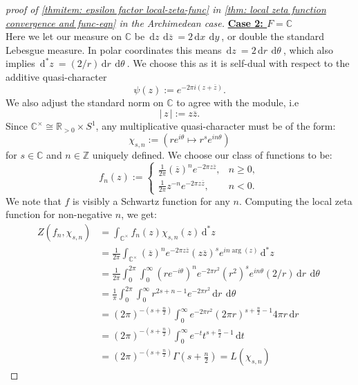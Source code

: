 \documentclass[11pt, x11names, openany]{book}
\newcommand{\zz}{\mathbb{Z}}
\newcommand{\rr}{\mathbb{R}}
\newcommand{\cc}{\mathbb{C}}
\renewcommand{\bar}[1]{\overline{#1}}
\renewcommand{\brack}[1]{\left(   #1 \right)}
\newcommand{\abs}[1]{\left| \, #1  \,\right|}
\newcommand{\dr}{\, \mathrm{d}r \ }
\newcommand{\dt}{\, \mathrm{d}t \ }
\newcommand{\dx}{\, \mathrm{d}x \ }
\newcommand{\dy}{\, \mathrm{d}y \ }
\newcommand{\dz}{\, \mathrm{d}z \ }
\newcommand{\dtheta}{\, \mathrm{d}\theta \ }
\renewcommand{\d}[1]{\, \mathrm{d}#1 \ }
\begin{document}
\begin{proof}[proof of \ref{thmitem: epsilon factor local-zeta-func} in \ref{thm: local zeta function convergence and func-eqn} in the Archimedean case]
\textbf{\underline{Case 2: $F = \cc$}}\\
Here we let our measure on $\cc$ be $\dz \d{\bar{z}} = 2 \dx\dy$, or double the standard Lebesgue measure. In polar coordinates this means $\dz = 2 \dr \dtheta$, which also implies $\d{^*z} = (2/r) \dr \dtheta$. We choose this as it is self-dual with respect to the additive quasi-character
\begin{equation*}
    \psi(z) := e^{- 2 \pi i (z + \bar{z})}.
\end{equation*} 
We also adjust the standard norm on $\cc$ to agree with the module, i.e
\begin{equation*}
    \abs{z} := z \bar{z}.
\end{equation*}
Since $\cc^\times \cong \rr_{> 0} \times S^1$, any multiplicative quasi-character must be of the form:
\begin{equation*}
    \chi_{s, n} := (re^{i\theta} \mapsto r^s e^{i n \theta})
\end{equation*}
for $s \in \cc$ and $n \in \zz$ uniquely defined. We choose our class of functions to be:
\begin{equation*}
    f_n(z) := \begin{cases}
        \frac{1}{2\pi} \brack{\bar{z}}^n e^{- 2 \pi z \bar{z}}, & n \geq 0,\\
        \frac{1}{2\pi} z^{-n} e^{- 2 \pi z \bar{z}}, & n < 0.
    \end{cases}
\end{equation*}
We note that $f$ is visibly a Schwartz function for any $n$. Computing the local zeta function for non-negative $n$, we get:
\begin{align*}
    Z(f_n, \chi_{s, n}) &= \int_{\cc^\times} f_n(z) \chi_{s, n}(z)\d{^*z}\\
    &= \frac{1}{2\pi} \int_{\cc^\times}\brack{\bar{z}}^ne^{ - 2 \pi z \bar{z}}(z \bar{z})^s e^{i n \arg(z)}\d{^*z}\\
    &= \frac{1}{2\pi} \int^{2 \pi}_0 \int^\infty_0 (re^{-i \theta})^n e^{-2 \pi r^2} (r^2)^s e^{i n \theta} (2/r) \dr \dtheta\\
    &= \frac{1}{\pi} \int^{2\pi}_0 \int^\infty_0 r^{2s + n - 1} e^{-2 \pi r^2} \dr \dtheta\\
    &= (2 \pi)^{-\brack{s + \frac{n}{2}}} \int_0^\infty e^{- 2 \pi r^2} (2 \pi r)^{s + \frac{n}{2} - 1} 4 \pi r \dr\\
    &= (2 \pi)^{-\brack{s + \frac{n}{2}}} \int^\infty_0 e^{-t} t^{s + \frac{n}{2} - 1} \dt\\
    &= (2\pi)^{-\brack{s + \frac{n}{2}}} \Gamma(s + \frac{n}{2}) = L(\chi_{s, n})

\end{align*}
\end{proof}
\end{document}
